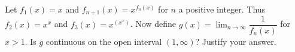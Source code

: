 Let $f_1(x) = x$ and $f_{n+1}(x) = x^{f_n(x)}$ for $n$ a positive integer. Thus
$f_2(x) = x^x$ and $f_3(x) = x^{(x^x)}$. Now define $g(x) =
\displaystyle{\lim_{n \to \infty} \dfrac{1}{f_n(x)}}$ for $x > 1$. Is $g$ continuous on
the open interval $(1, \infty)$?  Justify your answer.
